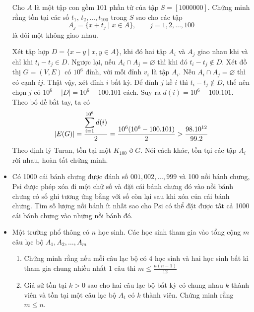 \documentclass[11pt]{scrartcl}
\begin{document}
\begin{itemize}[label=, leftmargin=0em, itemsep=0.5em]
        \begin{bt}
            Cho $A$ là một tập con gồm $101$ phần tử của tập $S=[1000000]$. Chứng minh rằng tồn tại các số $t_1$, $t_2, \ldots, t_{100}$ trong $S$ sao cho các tập\[ A_j=\{x+t_j\mid x\in A\},\qquad j=1,2,\ldots,100  \]là đôi một không giao nhau.
        \end{bt}
        \begin{sol}
            Xét tập hợp $D = \{x -y \mid x,y\in A\}$, khi đó hai tập $A_i$ và $A_j$ giao nhau khi và chỉ khi $t_i - t_j \in D$. Ngược lại, nếu $A_i \cap A_j = \varnothing$  thì khi đó $t_i - t_j \notin D$. Xét đồ thị $G = (V,E)$ có $10^6$ đỉnh, với mỗi đỉnh $v_i$ là tập $A_i$. Nếu $A_i \cap A_j = \varnothing$ thì có cạnh $ij$. Thật vậy, xét đỉnh $i$ bất kỳ. Để đỉnh $j$ kề $i$ thì $t_i - t_j \notin D$, thế nên chọn $j$ có $10^6 - |D| = 10^6 - 100.101$ cách. Suy ra $d(i) = 10^6 - 100.101$. Theo bổ đề bắt tay, ta có 
            \[
                |E(G)| = \frac{\dsum_{i = 1}^{10^6}d(i)}{2} = \frac{10^6(10^6 - 100.101)}{2} > \frac{98.10^{12}}{99.2}
            \]
            Theo định lý Turan, tồn tại một $K_{100}$ ở $G$. Nói cách khác, tồn tại các tập $A_i$ rời nhau, hoàn tất chứng minh.
        \end{sol}
    \item \begin{btvn} Có 1000 cái bánh chưng được đánh số $001,002,\dots,999$ và 100 nồi bánh chưng, Psi được phép xóa đi một chữ số và đặt cái bánh chưng đó vào nồi bánh chưng có số ghi tương ứng bằng với số còn lại sau khi xóa của cái bánh chưng. Tìm số lượng nồi bánh ít nhất sao cho Psi có thể đặt được tất cả 1000 cái bánh chưng vào những nồi bánh đó.        
    \end{btvn}
    \item \begin{btvn}
        Một trường phổ thông có $n$ học sinh. Các học sinh tham gia vào tổng cộng $m$ câu lạc bộ $A_1,A_2,\dots,A_m$
        \begin{enumerate}[label=(\alph*)]
            \item Chứng minh rằng nếu mỗi câu lạc bộ có 4 học sinh và hai học sinh bất kì tham gia chung nhiều nhất 1 câu thì $m \leq \frac{n(n - 1)}{12}$
            \item Giả sử tồn tại $k > 0$ sao cho hai câu lạc bộ bất kỳ có chung nhau $k$ thành viên và tồn tại một câu lạc bộ $A_t$ có $k$ thành viên. Chứng minh rằng $m \leq n$.

\end{enumerate}
\end{btvn}
\end{itemize}
\end{document}
